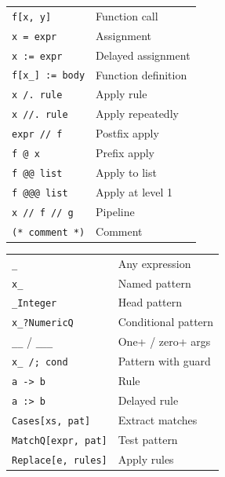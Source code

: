 \documentclass[10pt]{extarticle}
\begin{document}
\begin{multicols}{2}

\begin{tabularx}{\linewidth}{@{}l@{\enspace}Y@{}}
\texttt{f[x, y]}                    & Function call \\
\texttt{x = expr}                   & Assignment \\
\texttt{x := expr}                  & Delayed assignment \\
\texttt{f[x\_] := body}            & Function definition \\
\texttt{x /. rule}                  & Apply rule \\
\texttt{x //. rule}                 & Apply repeatedly \\
\texttt{expr // f}                  & Postfix apply \\
\texttt{f @ x}                      & Prefix apply \\
\texttt{f @@ list}                  & Apply to list \\
\texttt{f @@@ list}                 & Apply at level 1 \\
\texttt{x // f // g}               & Pipeline \\
\texttt{(* comment *)}             & Comment \\
\end{tabularx}

\begin{tabularx}{\linewidth}{@{}l@{\enspace}Y@{}}
\texttt{\_}                          & Any expression \\
\texttt{x\_}                        & Named pattern \\
\texttt{\_Integer}                  & Head pattern \\
\texttt{x\_?NumericQ}              & Conditional pattern \\
\texttt{\_\_} / \texttt{\_\_\_}     & One+ / zero+ args \\
\texttt{x\_ /; cond}               & Pattern with guard \\
\texttt{a -> b}                     & Rule \\
\texttt{a :> b}                     & Delayed rule \\
\texttt{Cases[xs, pat]}            & Extract matches \\
\texttt{MatchQ[expr, pat]}         & Test pattern \\
\texttt{Replace[e, rules]}         & Apply rules \\
\end{tabularx}


\end{multicols}
\end{document}
